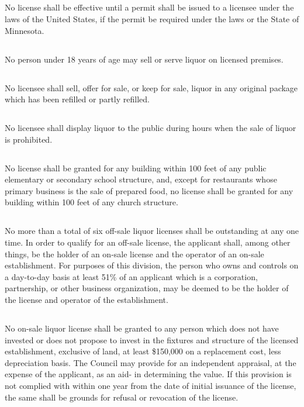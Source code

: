 \subsection{}
No license shall be effective until a permit shall be issued to a licensee under the laws of the United States, if the permit be required under the laws or the State of Minnesota.
\subsection{}
No person under 18 years of age may sell or serve liquor on licensed premises.
\subsection{}
No licensee shall sell, offer for sale, or keep for sale, liquor in any original package which has been refilled or partly refilled.
\subsection{}
No licensee shall display liquor to the public during hours when the sale of liquor is prohibited.
\subsection{}
No license shall be granted for any building within 100 feet of any public elementary or secondary school structure, and, except for restaurants whose primary business is the sale of prepared food, no license shall be granted for any building within 100 feet of any church structure.
\subsection{}
No more than a total of six off-sale liquor licenses shall be outstanding at any one time.  In order to qualify for an off-sale license, the applicant shall, among other things, be the holder of an on-sale license and the operator of an on-sale establishment.  For purposes of this division, the person who owns and controls on a day-to-day basis at least 51\% of an applicant which is a corporation, partnership, or other business organization, may be deemed to be the holder of the license and operator of the establishment.
\subsection{}
No on-sale liquor license shall be granted to any person which does not have invested or does not propose to invest in the fixtures and structure of the licensed establishment, exclusive of land, at least \$150,000 on a replacement cost, less depreciation basis.  The Council may provide for an independent appraisal, at the expense of the applicant, as an aid- in determining the value.  If this provision is not complied with within one year from the date of initial issuance of the license, the same shall be grounds for refusal or revocation of the license.
